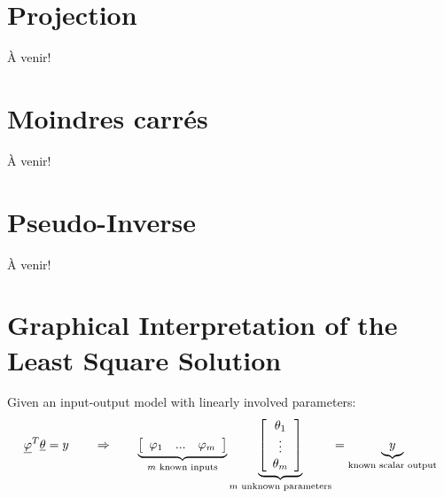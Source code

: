 \section{Projection}

À venir!

\section{Moindres carrés}

À venir!

\section{Pseudo-Inverse}

À venir!


\newpage
\section{Graphical Interpretation of the Least Square Solution}

Given an input-output model with linearly involved parameters:
\begin{align}
\underline{\varphi}^T \underline{\theta}
= y
\quad\quad\Rightarrow\quad\quad
\underbrace{ 
\left[ \begin{array}{c c c } 
\varphi_1 & ... & \varphi_m
\end{array} \right] }_{ m \text{ known inputs} }
\underbrace{ \left[ \begin{array}{c} 
\theta_1 \\ \vdots \\ \theta_m
\end{array} \right] }_{ m \text{ unknown parameters} } = 
\underbrace{y}_{\text{known scalar output} }
\end{align}

